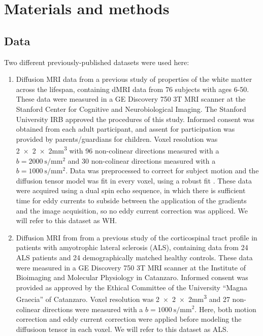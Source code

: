 \section*{Materials and methods}

\subsection*{Data}

Two different previously-published datasets were used here:

\begin{enumerate}

\item Diffusion MRI data from a previous study of properties of the white matter
across the lifespan\cite{yeatman2014lifespan}, containing dMRI data from 76
subjects with ages 6-50. These data were measured in a GE Discovery 750 3T MRI
scanner at the Stanford Center for Cognitive and Neurobiological Imaging. The
Stanford University IRB approved the procedures of this study. Informed consent
was obtained from each adult participant, and assent for participation was
provided by parents/guardians for children. Voxel resolution was
\num{2x2x2}\si{\milli\meter^3} with 96 non-colinear directions measured with a
$b= \SI{2000}{\second\per\milli\meter^2}$ and 30 non-colinear directions
measured with a $b=\SI{1000}{\second\per\milli\meter^2}$.
Data was preprocessed to correct for subject motion and the diffusion
tensor model \cite{basser1994mr} was fit in every voxel, using a robust fit
\cite{chang2005restore}. These data were acquired using a dual spin echo
sequence, in which there is sufficient time for eddy currents to subside between
the application of the gradients and the image acquisition, so no eddy current
correction was appliced. We will refer to this dataset as WH.

\item Diffusion MRI from from a previous study of the corticospinal tract
profile in patients with amyotrophic lateral sclerosis
(ALS)\cite{sarica2017corticospinal}, containing data from 24 ALS patients and 24
demographically matched healthy controls. These data were measured in a GE
Discovery 750 3T MRI scanner at the Institute of Bioimaging and Molecular
Physiology in Catanzaro. Informed consent was provided as approved by the
Ethical Committee of the University ``Magna Graecia'' of Catanzaro. Voxel
resolution was \num{2x2x2}\si{\milli\meter^3} and 27 non-colinear directions
were measured with a $b=\SI{1000}{\second\per\milli\meter^2}$.
Here, both motion correction and eddy current correction were
applied before modeling the diffusioon tensor in each voxel. We will refer to
this dataset as ALS.

\end{enumerate}

